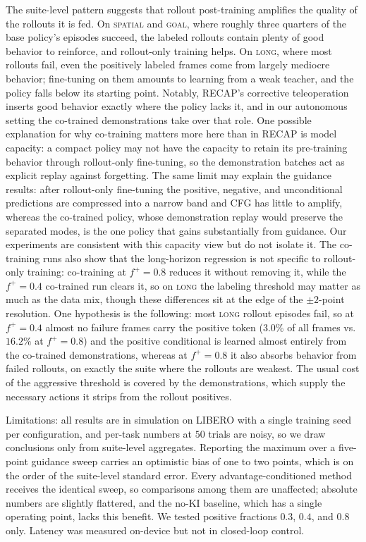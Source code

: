 \documentclass[conference]{IEEEtran}
\newcommand{\pf}{\ensuremath{f^{+}}}   %
\begin{document}
The suite-level pattern suggests that rollout post-training amplifies the quality of the
rollouts it is fed. On \textsc{spatial} and \textsc{goal}, where roughly three quarters of
the base policy's episodes succeed, the labeled rollouts contain plenty of good behavior
to reinforce, and rollout-only training helps. On \textsc{long}, where most rollouts fail,
even the positively labeled frames come from largely mediocre behavior; fine-tuning on
them amounts to learning from a weak teacher, and the policy falls below its starting
point. Notably, RECAP's corrective teleoperation inserts good behavior exactly where the
policy lacks it, and in our autonomous setting the co-trained demonstrations take over
that role. One possible explanation for why co-training matters more here than in RECAP is
model capacity: a compact policy may not have the capacity to retain its pre-training
behavior through rollout-only fine-tuning, so the demonstration batches act as explicit
replay against forgetting. The same limit may explain the guidance results: after
rollout-only fine-tuning the positive, negative, and unconditional predictions are
compressed into a narrow band and CFG has little to amplify, whereas the co-trained
policy, whose demonstration replay would preserve the separated modes, is the one policy
that gains substantially from guidance. Our experiments are consistent with this capacity
view but do not isolate it. The co-training runs also show that the long-horizon
regression is not specific to rollout-only training: co-training at $\pf{=}0.8$ reduces it
without removing it, while the $\pf{=}0.4$ co-trained run clears it, so on \textsc{long}
the labeling threshold may matter as much as the data mix, though these differences sit at
the edge of the $\pm2$-point resolution. One hypothesis is the following: most
\textsc{long} rollout episodes fail, so at $\pf{=}0.4$ almost no failure frames carry the
positive token ($3.0\%$ of all frames vs.\ $16.2\%$ at $\pf{=}0.8$) and the positive
conditional is learned almost entirely from the co-trained demonstrations, whereas at
$\pf{=}0.8$ it also absorbs behavior from failed rollouts, on exactly the suite where the
rollouts are weakest. The usual cost of the aggressive threshold is covered by the
demonstrations, which supply the necessary actions it strips from the rollout positives.

Limitations: all results are in simulation on LIBERO with a single training seed per
configuration, and per-task numbers at $50$ trials are noisy, so we draw conclusions only
from suite-level aggregates. Reporting the maximum over a five-point guidance sweep
carries an optimistic bias of one to two points, which is on the order of the suite-level
standard error. Every advantage-conditioned method receives the identical sweep, so
comparisons among them are unaffected; absolute numbers are slightly flattered, and the
no-KI baseline, which has a single operating point, lacks this benefit. We tested positive
fractions $0.3$, $0.4$, and $0.8$ only. Latency was measured on-device but not in
closed-loop control.
\end{document}
